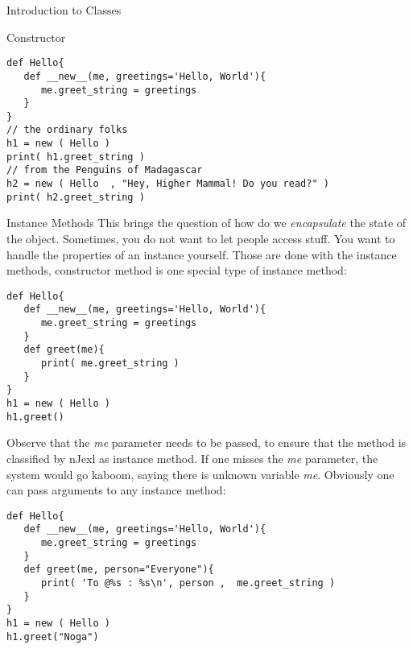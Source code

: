 \begin{section}{Introduction to Classes}
\begin{subsection}{Constructor}
\begin{center}\begin{minipage}{\linewidth}
\begin{lstlisting}[style=JexlStyle]
def Hello{
   def __new__(me, greetings='Hello, World'){
      me.greet_string = greetings
   } 
}
// the ordinary folks
h1 = new ( Hello )
print( h1.greet_string )
// from the Penguins of Madagascar
h2 = new ( Hello  , "Hey, Higher Mammal! Do you read?" )
print( h2.greet_string )
\end{lstlisting}  
\end{minipage}\end{center}
\end{subsection}

\begin{subsection}{Instance Methods}
This brings the question of how do we \emph{encapsulate} the state of the object.
Sometimes, you do not want to let people access stuff. You want to handle
the properties of an instance yourself. Those are done with the instance methods,
constructor method is one special type of instance method:

\begin{center}\begin{minipage}{\linewidth}
\begin{lstlisting}[style=JexlStyle]
def Hello{
   def __new__(me, greetings='Hello, World'){
      me.greet_string = greetings
   } 
   def greet(me){
      print( me.greet_string )
   }
}
h1 = new ( Hello )
h1.greet()
\end{lstlisting}  
\end{minipage}\end{center}
Observe that the \emph{me} parameter needs to be passed, to ensure 
that the method is classified by nJexl as instance method.
If one misses the \emph{me} parameter, the system would go kaboom, 
saying there is unknown variable \emph{me}. 
Obviously one can pass arguments to any instance method:

\begin{center}\begin{minipage}{\linewidth}
\begin{lstlisting}[style=JexlStyle]
def Hello{
   def __new__(me, greetings='Hello, World'){
      me.greet_string = greetings
   } 
   def greet(me, person="Everyone"){
      print( 'To @%s : %s\n', person ,  me.greet_string )
   }
}
h1 = new ( Hello )
h1.greet("Noga")
\end{lstlisting}  
\end{minipage}\end{center}

\end{subsection}
\end{section}

